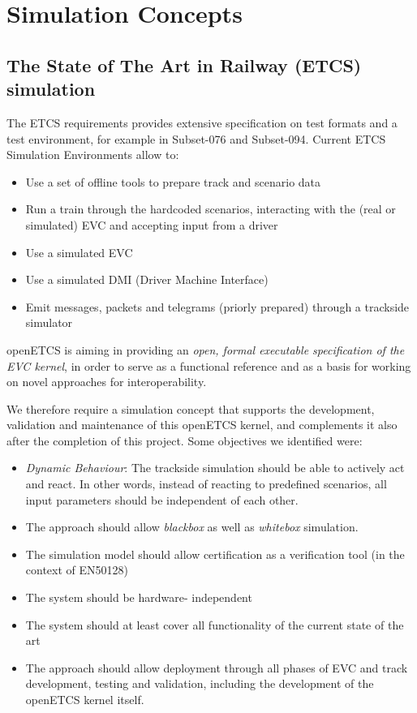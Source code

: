 \documentclass{template/openetcs_article}
\begin{document}
\section{Simulation Concepts}
\subsection{The State of The Art in Railway (ETCS) simulation}

The ETCS requirements provides extensive specification on test formats and a test environment, for example in Subset-076 and Subset-094.
Current ETCS Simulation Environments allow to:
\begin{itemize}
 \item Use a set of offline tools to prepare track and scenario data 
 \item Run a train through the hardcoded scenarios, interacting with the (real or simulated) EVC and accepting input from a driver
 \item Use a simulated EVC
 \item Use a simulated DMI (Driver Machine Interface)
 \item Emit messages, packets and telegrams (priorly prepared) through a trackside simulator
\end{itemize}
 
openETCS is aiming in providing an \emph{open, formal executable specification of the EVC kernel}, in order to serve as a functional reference and as a basis for working on novel approaches for interoperability.

We therefore require a simulation concept that supports the development, validation and maintenance of this openETCS kernel, and complements it also after the completion of this project. Some objectives we identified were:
\begin{itemize}
 \item \emph{Dynamic Behaviour}: The trackside simulation should be able to actively act and react. In other words, instead of reacting to predefined scenarios, all input parameters should be independent of each other. 
 \item The approach should allow \emph{blackbox} as well as \emph{whitebox} simulation.
 \item The simulation model should allow certification as a verification tool (in the context of EN50128)
 \item The system should be hardware- independent
 \item The system should at least cover all functionality of the current state of the art
 \item The approach should allow deployment through all phases of EVC and track development, testing and validation, including the development of the openETCS kernel itself.
\end{itemize}
 
\end{document}
